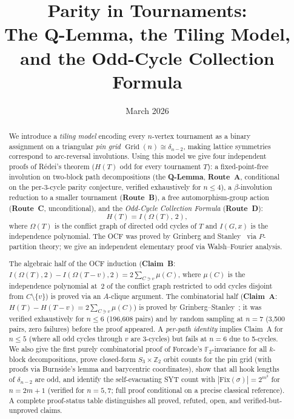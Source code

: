\documentclass[12pt,reqno]{amsart}
\title[Parity in Tournaments]{%
  Parity in Tournaments:\\[4pt]
  The Q-Lemma, the Tiling Model,\\[2pt]
  and the Odd-Cycle Collection Formula}
\date{March 2026}
\theoremstyle{plain}
\theoremstyle{definition}
\theoremstyle{remark}
\DeclareMathOperator{\Grid}{Grid}
\begin{document}
\begin{abstract}
We introduce a \emph{tiling model} encoding every $n$-vertex tournament as a
binary assignment on a triangular \emph{pin grid} $\Grid(n) \cong \delta_{n-2}$,
making lattice symmetries correspond to arc-reversal involutions.
Using this model we give four independent proofs of R\'{e}dei's theorem
($H(T)$ odd for every tournament $T$): a fixed-point-free involution on
two-block path decompositions (the \textbf{Q-Lemma}, \textbf{Route~A},
conditional on the per-3-cycle parity conjecture, verified exhaustively for
$n\le4$),
a $\beta$-involution reduction to a smaller tournament (\textbf{Route~B}),
a free automorphism-group action (\textbf{Route~C}, unconditional), and the
\emph{Odd-Cycle Collection Formula} (\textbf{Route~D}):
\[
  H(T) = I(\Omega(T),\,2),
\]
where $\Omega(T)$ is the conflict graph of directed odd cycles of $T$ and
$I(G,x)$ is the independence polynomial.
The OCF was proved by Grinberg and Stanley~\cite{grinberg2024} via
$P$-partition theory; we give an independent elementary proof via
Walsh--Fourier analysis.

The algebraic half of the OCF induction
(\textbf{Claim~B}: $I(\Omega(T),2)-I(\Omega(T{-}v),2)=2\sum_{C\ni v}\mu(C)$,
where $\mu(C)$ is the independence polynomial at~$2$ of the conflict graph
restricted to odd cycles disjoint from $C\setminus\{v\}$) is proved via
an $A$-clique argument. The combinatorial half (\textbf{Claim~A}:
$H(T)-H(T{-}v)=2\sum_{C\ni v}\mu(C)$) is proved by
Grinberg--Stanley~\cite{grinberg2024};
it was verified exhaustively for $n\le 6$ (196,608 pairs) and by random
sampling at $n=7$ (3,500 pairs, zero failures) before the proof appeared.
A \emph{per-path identity} implies Claim~A for $n\le5$ (where all odd cycles
through $v$ are 3-cycles) but fails at $n=6$ due to 5-cycles.
We also give the first purely combinatorial proof of Forcade's
$\mathbb{F}_2$-invariance for all $k$-block decompositions, prove closed-form
$S_3\times\mathbb{Z}_2$ orbit counts for the pin grid (with proofs via
Burnside's lemma and barycentric coordinates), show that all hook lengths
of $\delta_{n-2}$ are odd, and identify the self-evacuating SYT count with
$|\mathrm{Fix}(\sigma)|=2^{m^2}$ for $n=2m+1$ (verified for $n=5,7$;
full proof conditional on a precise classical reference).
A complete proof-status table distinguishes all proved, refuted, open, and
verified-but-unproved claims.
\end{abstract}

\maketitle
\setcounter{tocdepth}{2}
\tableofcontents
\end{document}

